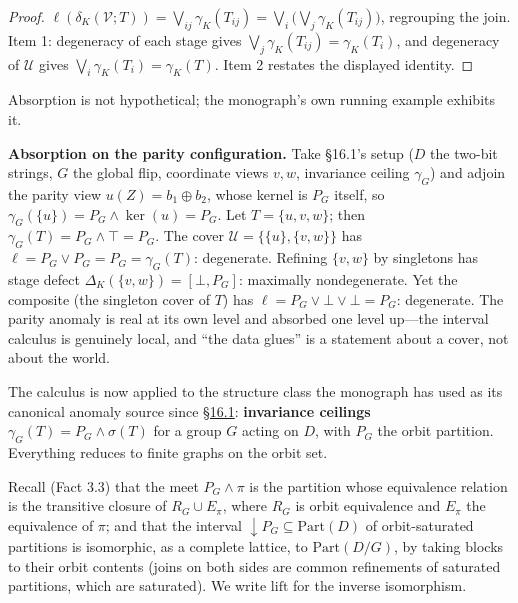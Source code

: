 \begin{proof}

\(\ell(\delta_K(\mathcal{V};T)) = \bigvee_{ij}\gamma_K(T_{ij}) = \bigvee_i \big(\bigvee_j \gamma_K(T_{ij})\big)\), regrouping the join. Item 1: degeneracy of each stage gives \(\bigvee_j \gamma_K(T_{ij}) = \gamma_K(T_i)\), and degeneracy of \(\mathcal{U}\) gives \(\bigvee_i \gamma_K(T_i) = \gamma_K(T)\). Item 2 restates the displayed identity.
\end{proof}

Absorption is not hypothetical; the monograph's own running example exhibits it.

\textbf{Absorption on the parity configuration.} Take §16.1's setup (\(D\) the two-bit strings, \(G\) the global flip, coordinate views \(v, w\), invariance ceiling \(\gamma_G\)) and adjoin the parity view \(u(Z) = b_1 \oplus b_2\), whose kernel is \(P_G\) itself, so \(\gamma_G(\{u\}) = P_G \wedge \ker(u) = P_G\). Let \(T = \{u, v, w\}\); then \(\gamma_G(T) = P_G \wedge \top = P_G\). The cover \(\mathcal{U} = \{\{u\}, \{v,w\}\}\) has \(\ell = P_G \vee P_G = P_G = \gamma_G(T)\): degenerate. Refining \(\{v,w\}\) by singletons has stage defect \(\Delta_{K}(\{v,w\}) = [\bot, P_G]\): maximally nondegenerate. Yet the composite (the singleton cover of \(T\)) has \(\ell = P_G \vee \bot \vee \bot = P_G\): degenerate. The parity anomaly is real at its own level and absorbed one level up---\hspace{0pt}the interval calculus is genuinely local, and ``the data glues'' is a statement about a cover, not about the world.


The calculus is now applied to the structure class the monograph has used as its canonical anomaly source since \hyperlink{sec:16.1}{§16.1}: \textbf{invariance ceilings} \(\gamma_G(T) = P_G \wedge \sigma(T)\) for a group \(G\) acting on \(D\), with \(P_G\) the orbit partition. Everything reduces to finite graphs on the orbit set.

Recall (Fact 3.3) that the meet \(P_G \wedge \pi\) is the partition whose equivalence relation is the transitive closure of \(R_G \cup E_\pi\), where \(R_G\) is orbit equivalence and \(E_\pi\) the equivalence of \(\pi\); and that the interval \({\downarrow} P_G \subseteq \mathrm{Part}(D)\) of orbit-saturated partitions is isomorphic, as a complete lattice, to \(\mathrm{Part}(D/G)\), by taking blocks to their orbit contents (joins on both sides are common refinements of saturated partitions, which are saturated). We write \(\mathrm{lift}\) for the inverse isomorphism.

